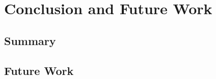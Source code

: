 \chapter{Conclusion and Future Work}
\label{chap:conclusion}

\section{Summary}

\section{Future Work}

